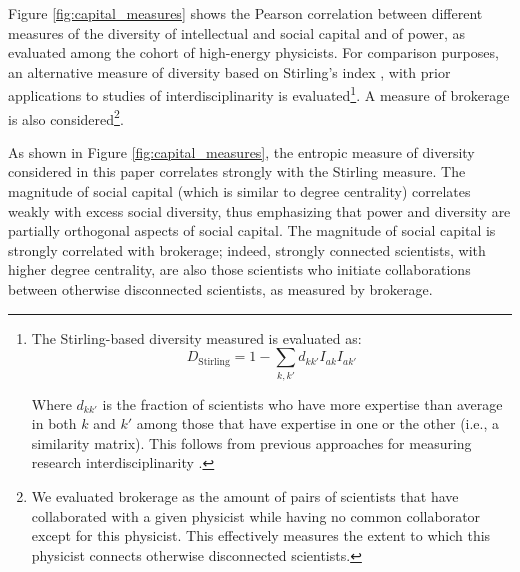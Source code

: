 \documentclass{article}
\begin{document}
Figure \ref{fig:capital_measures} shows the Pearson correlation between different measures of the diversity of intellectual and social capital and of power, as evaluated among the cohort of high-energy physicists. For comparison purposes, an alternative measure of diversity based on Stirling's index \citep{Stirling2007}, with prior applications to studies of interdisciplinarity \citep{Porter2007,Leahey2016} is evaluated\footnote{The Stirling-based diversity measured is evaluated as: \begin{equation}
    D_{\text{Stirling}} = 1-\sum_{k,k'}d_{kk'}I_{ak}I_{ak'}
\end{equation}

Where $d_{kk'}$ is the fraction of scientists who have more expertise than average in both $k$ and $k'$ among those that have expertise in one or the other (i.e., a similarity matrix). This  follows from previous approaches for measuring research interdisciplinarity \citealt{Porter2007,Leahey2016}.}. A measure of brokerage is also considered\footnote{We evaluated brokerage as the amount of pairs of scientists that have collaborated with a given physicist while having no common collaborator except for this physicist. This effectively measures the extent to which this physicist connects otherwise disconnected scientists.}. 

As shown in Figure \ref{fig:capital_measures}, the entropic measure of diversity considered in this paper correlates strongly with the Stirling measure. The magnitude of social capital (which is similar to degree centrality) correlates weakly with excess social diversity, thus emphasizing that power and diversity are partially orthogonal aspects of social capital. The magnitude of social capital is strongly correlated with brokerage; indeed, strongly connected scientists, with higher degree centrality, are also those scientists who initiate collaborations between otherwise disconnected scientists, as measured by brokerage.
\end{document}

